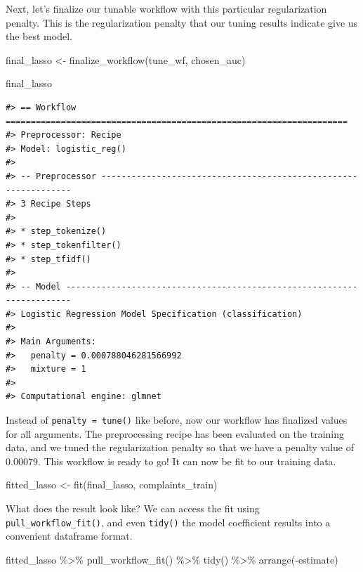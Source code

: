 \documentclass[
]{krantz}
\makeatletter
\newenvironment{Shaded}{\begin{snugshade}}{\end{snugshade}}
\newcommand{\FunctionTok}[1]{\textcolor[rgb]{0.00,0.00,0.00}{#1}}
\newcommand{\NormalTok}[1]{#1}
\newcommand{\OtherTok}[1]{\textcolor[rgb]{0.56,0.35,0.01}{#1}}
\newcommand{\SpecialCharTok}[1]{\textcolor[rgb]{0.00,0.00,0.00}{#1}}
\newenvironment{kframe}{%
\medskip{}
\setlength{\fboxsep}{.8em}
 \def\at@end@of@kframe{}%
 \ifinner\ifhmode%
  \def\at@end@of@kframe{\end{minipage}}%
  \begin{minipage}{\columnwidth}%
 \fi\fi%
 \def\FrameCommand##1{\hskip\@totalleftmargin \hskip-\fboxsep
 \colorbox{shadecolor}{##1}\hskip-\fboxsep
     \hskip-\linewidth \hskip-\@totalleftmargin \hskip\columnwidth}%
 \MakeFramed {\advance\hsize-\width
   \@totalleftmargin\z@ \linewidth\hsize
   \@setminipage}}%
 {\par\unskip\endMakeFramed%
 \at@end@of@kframe}
\renewenvironment{Shaded}{\begin{kframe}}{\end{kframe}}
\makeatother
\begin{document}
Next, let's finalize our tunable workflow with this particular regularization penalty. This is the regularization penalty that our tuning results indicate give us the best model.

\begin{Shaded}
\begin{Highlighting}[]
\NormalTok{final\_lasso }\OtherTok{\textless{}{-}} \FunctionTok{finalize\_workflow}\NormalTok{(tune\_wf, chosen\_auc)}

\NormalTok{final\_lasso}
\end{Highlighting}
\end{Shaded}

\begin{verbatim}
#> == Workflow ====================================================================
#> Preprocessor: Recipe
#> Model: logistic_reg()
#> 
#> -- Preprocessor ----------------------------------------------------------------
#> 3 Recipe Steps
#> 
#> * step_tokenize()
#> * step_tokenfilter()
#> * step_tfidf()
#> 
#> -- Model -----------------------------------------------------------------------
#> Logistic Regression Model Specification (classification)
#> 
#> Main Arguments:
#>   penalty = 0.000788046281566992
#>   mixture = 1
#> 
#> Computational engine: glmnet
\end{verbatim}

Instead of \texttt{penalty\ =\ tune()} like before, now our workflow has finalized values for all arguments. The preprocessing recipe has been evaluated on the training data, and we tuned the regularization penalty so that we have a penalty value of 0.00079. This workflow is ready to go! It can now be fit to our training data.

\begin{Shaded}
\begin{Highlighting}[]
\NormalTok{fitted\_lasso }\OtherTok{\textless{}{-}} \FunctionTok{fit}\NormalTok{(final\_lasso, complaints\_train)}
\end{Highlighting}
\end{Shaded}

What does the result look like? We can access the fit using \texttt{pull\_workflow\_fit()}, and even \texttt{tidy()} the model coefficient results into a convenient dataframe format.

\begin{Shaded}
\begin{Highlighting}[]
\NormalTok{fitted\_lasso }\SpecialCharTok{\%\textgreater{}\%}
  \FunctionTok{pull\_workflow\_fit}\NormalTok{() }\SpecialCharTok{\%\textgreater{}\%}
  \FunctionTok{tidy}\NormalTok{() }\SpecialCharTok{\%\textgreater{}\%}
  \FunctionTok{arrange}\NormalTok{(}\SpecialCharTok{{-}}\NormalTok{estimate)}
\end{Highlighting}
\end{Shaded}
\end{document}
